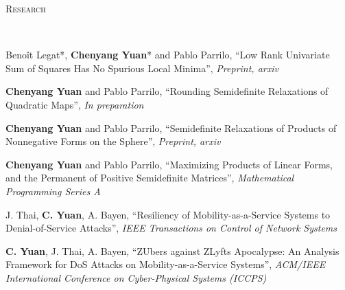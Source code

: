 \documentclass[9pt]{article}
\newenvironment{changemargin}[2]{%
  \begin{list}{}{%
      \setlength{\topsep}{0pt}%
      \setlength{\leftmargin}{#1}%
      \setlength{\rightmargin}{#2}%
      \setlength{\listparindent}{\parindent}%
      \setlength{\itemindent}{\parindent}%
      \setlength{\parsep}{\parskip}%
    }%
  \item[]}{\end{list}
}
\newcommand{\lineover}{
  \begin{changemargin}{-0.05in}{-0.05in}
    \vspace*{-8pt}
    \hrulefill \\
    \vspace*{-2pt}
  \end{changemargin}
}
\newcommand{\header}[1]{
  \begin{changemargin}{-0.5in}{-0.5in}
    \scshape{#1}\\
    \lineover
  \end{changemargin}
}
\newenvironment{body} {
  \vspace*{-16pt}
  \begin{changemargin}{-0.25in}{-0.5in}
  }
  {\end{changemargin}
}
\begin{document}
\header{Research}
\begin{body}
  \vspace{14pt}

  Beno\^it Legat*, \textbf{Chenyang Yuan}* and Pablo Parrilo, ``Low Rank
  Univariate Sum of
  Squares Has No Spurious Local Minima'', \emph{Preprint, arxiv}\\
  \smallskip

  \textbf{Chenyang Yuan} and Pablo Parrilo,
  ``Rounding Semidefinite Relaxations of Quadratic Maps'', \emph{In preparation}\\
  \smallskip

  \textbf{Chenyang Yuan} and Pablo Parrilo, ``Semidefinite Relaxations of
  Products of
  Nonnegative Forms on the Sphere'', \emph{Preprint, arxiv}\\
  \smallskip

  \textbf{Chenyang Yuan} and Pablo Parrilo, ``Maximizing Products of Linear
  Forms, and
  the Permanent of Positive Semidefinite Matrices'', \emph{Mathematical Programming Series A}\\
  \smallskip

  J. Thai, \textbf{C. Yuan}, A. Bayen, ``Resiliency of Mobility-as-a-Service
  Systems to
  Denial-of-Service Attacks'', \emph{IEEE Transactions on Control of Network Systems}\\
  \smallskip

  \textbf{C. Yuan}, J. Thai, A. Bayen, ``ZUbers against ZLyfts Apocalypse: An
  Analysis Framework for DoS Attacks on Mobility-as-a-Service Systems'',
  \emph{ACM/IEEE International Conference on Cyber-Physical Systems
    (ICCPS)}
\end{body}
\smallskip

%
\end{document}
